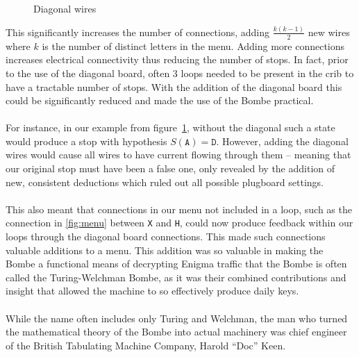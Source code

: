 \begin{figure}[H]
\begin{center}
  \end{center}
  \caption{Diagonal wires}
  \label{fig:diagonal}
\end{figure}
\noindent This significantly increases the number of connections,
adding $\frac{k(k-1)}{2}$ new wires where $k$ is the number of
distinct letters in the menu. Adding more connections increases electrical
connectivity thus reducing the number of stops. In fact, prior to the
use of the diagonal board, often $3$ loops needed to be present in
the crib to have a tractable number of stops. With the addition of
the diagonal board this could be significantly reduced and made the
use of the Bombe practical.
\\\\For instance, in our example from figure~\ref{fig:diagonal},
without the diagonal such a state would produce a stop with
hypothesis $S(\texttt{A}) = \texttt{D}$. However, adding the diagonal
wires would cause all wires to have current flowing through them --
meaning that our original stop must have been a false one, only
revealed by the addition of new, consistent deductions which ruled
out all possible plugboard settings.
\\\\This also meant that connections in our menu not included in a
loop, such as the connection in \ref{fig:menu} between \texttt{X} and
\texttt{H}, could now produce feedback within our loops through the
diagonal board connections. This made such connections valuable
additions to a menu. This addition was so valuable in making the
Bombe a functional means of decrypting Enigma traffic that the Bombe
is often called the Turing-Welchman Bombe, as it was their combined
contributions and insight that allowed the machine to so effectively
produce daily keys.
\\\\While the name often includes only Turing and Welchman, the man
who turned the mathematical theory of the Bombe into actual machinery
was chief engineer of the British Tabulating Machine Company, Harold
``Doc'' Keen.

